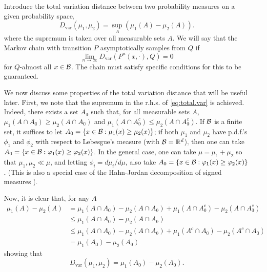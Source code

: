 Introduce the  total variation distance between two probability measures on a given probability space, 
\begin{equation}
\label{eq:total.var}
D_{\mathrm{var}}(\mu_1,\mu_2)  = \sup_A(\mu_1(A) - \mu_2(A)).
\end{equation}
where the supremum is taken over all measurable sets $A$. 
We will say that the Markov chain with transition $P$ asymptotically samples from $Q$ if 
\begin{equation}
\label{eq:mcmc.goal}
\lim_{n\to \infty} D_{\mathrm{var}}(P^n(x, \cdot),Q) = 0
\end{equation}
for $Q$-almost all $x\in {\mathcal B}$. The chain must satisfy specific conditions for this to be guaranteed.



We now discuss some properties of the total variation distance that will be useful later. First, we note that the supremum in the r.h.s. of \cref{eq:total.var} is achieved. Indeed, there exists a set $A_0$ such that, for all measurable sets $A$, $\mu_1(A\cap A_0) \geq \mu_2(A\cap A_0)$ and $\mu_1(A\cap A^c_0) \leq \mu_2(A\cap A^c_0)$. If ${\mathcal B}$ is a finite set, it suffices to let $A_0= \{x\in {\mathcal B}: \mu_1(x) \geq \mu_2(x)\}$; if both $\mu_1$ and $\mu_2$ have p.d.f.'s $\phi_1$ and $\phi_2$ with respect to Lebesgue's measure (with ${\mathcal B} = {\mathbb{R}}^d$), then one can take  
$A_0= \{x\in {\mathcal B}: \varphi_1(x) \geq \varphi_2(x)\}$. In the general case, one can take $\mu = \mu_1+\mu_2$ so that $\mu_1, \mu_2\ll \mu$, and letting $\phi_i = d\mu_i/d\mu$, also take $A_0= \{x\in {\mathcal B}: \varphi_1(x) \geq \varphi_2(x)\}$. (This is also a special case of  the Hahn-Jordan decomposition of signed measures \citep{dudley2018real}). 

Now, it is clear that, for any $A$
\begin{align*}
\mu_1(A) - \mu_2(A) &= \mu_1(A\cap A_0) - \mu_2(A\cap A_0) + \mu_1(A\cap A^c_0) - \mu_2(A\cap A^c_0)\\
&\leq \mu_1(A\cap A_0) - \mu_2(A\cap A_0) \\
&\leq \mu_1(A\cap A_0) - \mu_2(A\cap A_0) + \mu_1(A^c\cap A_0) - \mu_2(A^c\cap A_0)\\
&= \mu_1(A_0) - \mu_2(A_0)
\end{align*}
showing that
\[
D_{\mathrm{var}}(\mu_1,\mu_2)  = \mu_1(A_0) - \mu_2(A_0).
\]

